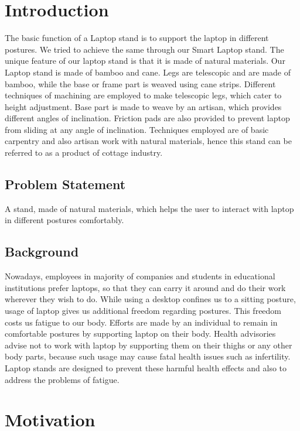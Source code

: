 \chapter{Introduction}

The basic function of a Laptop stand is to support the laptop in different postures. We tried to achieve the same through our Smart Laptop stand. The unique feature of our laptop stand is that it is made of natural materials. Our Laptop stand is made of bamboo and cane. Legs are telescopic and are made of bamboo, while the base or frame part is weaved using cane strips. Different techniques of machining are employed to make telescopic legs, which cater to height adjustment. Base part is made to weave by an artisan, which provides different angles of inclination. Friction pads are also provided to prevent laptop from sliding at any angle of inclination. Techniques employed are of basic carpentry and also artisan work with natural materials, hence this stand can be referred to as a product of cottage industry. 

\section{Problem Statement}

A stand, made of natural materials, which helps the user to interact with laptop in different postures comfortably.

\section{Background}

Nowadays, employees in majority of companies and students in educational institutions prefer laptops, so that they can carry it around and do their work wherever they wish to do. While using a desktop confines us to a sitting posture, usage of laptop gives us additional freedom regarding postures. This freedom costs us fatigue to our body. Efforts are made by an individual to remain in comfortable postures by supporting laptop on their body. Health advisories advise not to work with laptop by supporting them on their thighs or any other body parts, because such usage may cause fatal health issues such as infertility. Laptop stands are designed to prevent these harmful health effects and also to address the problems of fatigue.  

\chapter{Motivation}

